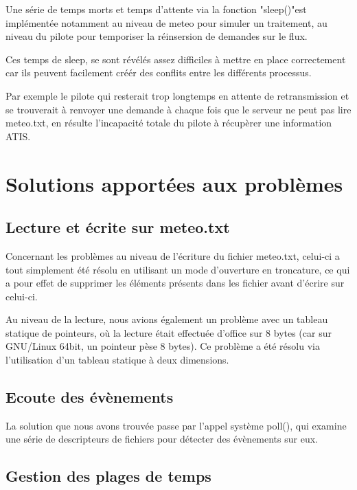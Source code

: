 \documentclass{report}
\begin{document}
{			Une série de temps morts et temps d'attente via la fonction "sleep()"est implémentée notamment au niveau de meteo pour simuler un traitement, au niveau du pilote pour temporiser la réinsersion de demandes sur le flux.

			Ces temps de sleep, se sont révélés assez difficiles à mettre en place correctement car ils peuvent facilement créér des conflits entre les différents processus.

			Par exemple le pilote qui resterait trop longtemps en attente de retransmission et se trouverait à renvoyer une demande à chaque fois que le serveur ne peut pas lire meteo.txt, en résulte l'incapacité totale du pilote à récupèrer une information ATIS.

	\section{Solutions apportées aux problèmes}

		\subsection{Lecture et écrite sur meteo.txt}

			Concernant les problèmes au niveau de l'écriture du fichier meteo.txt, celui-ci a tout simplement été résolu en utilisant un mode d'ouverture en troncature, ce qui a pour effet de supprimer les éléments présents dans les fichier avant d'écrire sur celui-ci.

			Au niveau de la lecture, nous avions également un problème avec un tableau statique de pointeurs, où la lecture était effectuée d'office sur 8 bytes (car sur GNU/Linux 64bit, un pointeur pèse 8 bytes). Ce problème a été résolu via l'utilisation d'un tableau statique à deux dimensions.

		\subsection{Ecoute des évènements}

			La solution que nous avons trouvée passe par l'appel système poll(), qui examine une série de descripteurs de fichiers pour détecter des évènements sur eux. \cite{sysCalls} \cite{pollArticle}

		\subsection{Gestion des plages de temps}

}
\end{document}
